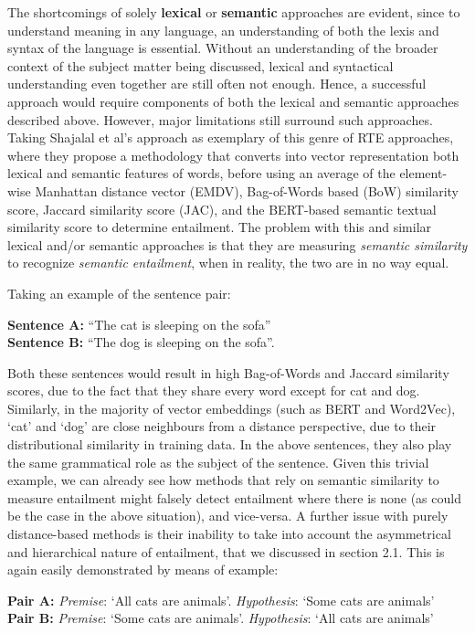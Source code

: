 \documentclass[12pt,twoside]{report}
\begin{document}
The shortcomings of solely \textbf{lexical} or \textbf{semantic} approaches are evident, since to understand meaning in any language, an understanding of both the lexis and syntax of the language is essential. Without an understanding of the broader context of the subject matter being discussed, lexical and syntactical understanding even together are still often not enough. Hence, a successful approach would require components of both the lexical and semantic approaches described above. However, major limitations still surround such approaches. Taking Shajalal et al's \cite{shajalal} approach as exemplary of this genre of RTE approaches, where they propose a methodology that converts into vector representation both lexical and semantic features of words, before using an average of the element-wise Manhattan distance vector (EMDV), Bag-of-Words based (BoW) similarity score, Jaccard similarity score (JAC), and the BERT-based semantic textual similarity score to determine entailment. The problem with this and similar lexical and/or semantic approaches is that they are measuring \textit{semantic similarity} to recognize \textit{semantic entailment}, when in reality, the two are in no way equal. \newline \par

Taking an example of the sentence pair:
\begin{flushleft}
    \textbf{Sentence A:} ``The cat is sleeping on the sofa''\\
    \textbf{Sentence B:} ``The dog is sleeping on the sofa''. 
\end{flushleft}

Both these sentences would result in high Bag-of-Words and Jaccard similarity scores, due to the fact that they share every word except for cat and dog. Similarly, in the majority of vector embeddings (such as BERT and Word2Vec), `cat' and `dog' are close neighbours from a distance perspective, due to their distributional similarity in training data. In the above sentences, they also play the same grammatical role as the subject of the sentence. Given this trivial example, we can already see how methods that rely on semantic similarity to measure entailment might falsely detect entailment where there is none (as could be the case in the above situation), and vice-versa. A further issue with purely distance-based methods is their inability to take into account the asymmetrical and hierarchical nature of entailment, that we discussed in section 2.1. This is again easily demonstrated by means of example:
\begin{flushleft}
    \textbf{Pair A:} \textit{Premise}: `All cats are animals'. \textit{Hypothesis}: `Some cats are animals' \\
    \textbf{Pair B:} \textit{Premise}: `Some cats are animals'. \textit{Hypothesis}: `All cats are animals'
\end{flushleft}
\end{document}
